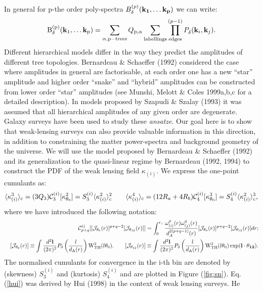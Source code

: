 \documentclass[usenatbib]{mn2e}
\def\be{\begin{equation}}
\def\ee{\end{equation}}
\def\be{\begin{equation}}
\def\ee{\end{equation}}
\newcommand{\beqa}{\begin{eqnarray}}
\newcommand{\eeqa}{\end{eqnarray}}
\def\ikap0{{\cal J}_{\theta_0}(r)}
\def\ikapp{{\cal J}_{\theta_{12}}(r)}
\begin{document}
%
In general for p-the order poly-spectra $B^{(p)}_{\delta}( {\bf k_1}, \dots {\bf k_p} )$ we can write:
\begin{equation}
{\rm B}^{({\rm p})}_{\delta}( {\bf k}_1, \dots {\bf k}_{\rm p} ) = \sum_{\alpha, \rm p-trees}
Q_{{\rm p},\alpha} \sum_{\rm labellings} \prod_{\rm edges}^{(p-1)}
P^{}_{\delta}({\bf k}_i, {\bf k}_j) .
\end{equation}
%
Different hierarchical models differ in the way they predict the
amplitudes of different tree topologies. Bernardeau \&
Schaeffer (1992) considered the case where amplitudes in general are
factorisable, at each order one has a new ``star'' amplitude 
 and higher order ``snake'' and ``hybrid'' amplitudes can
be constructed from lower order ``star'' amplitudes (see Munshi,
Melott \& Coles 1999a,b,c for a detailed description). In models proposed by
Szapudi \& Szalay (1993) it was assumed that all hierarchical amplitudes of any
given order are degenerate. Galaxy surveys
have been used to study these {\em ansatze}. Our goal here is to
show that weak-lensing surveys can also provide valuable information
in this direction, in addition to constraining the matter power-spectra and
background geometry of the universe. We will use the model proposed by 
Bernardeau \& Schaeffer (1992) and its generalization to the 
quasi-linear regime by Bernardeau (1992, 1994) to construct the PDF
of the weak lensing field $\kappa_{(i)}$. We express 
the one-point cumulants as:
%
\be
\langle \kappa_{(i)}^3\rangle_c = (3Q_3){\cal C}^{(i)}_3[\kappa^2_{\theta_0}] 
= S_3^{(i)} \langle \kappa_{(i)}^2 \rangle_c^2 \label {hui} \quad\quad
\langle \kappa_{(i)}^4\rangle_c = (12R_a + 4
R_b){\cal C}^{(i)}_4[\kappa^3_{\theta_0}] = S_4^{(i)} \langle \kappa_{(i)}^2\rangle_c^3,
\ee
%
where we have introduced the following notation:
\beqa
&& {\cal C}^{ij}_{p+q}[[\ikap0]^{p+q-2} [\ikapp] ] =
\int_0^{r_s} { \omega_{(i)}^{p}(r)\omega_{(j)}^q(r) \over
d_A^{2(p+q-1)}(r)}[\ikap0]^{p+q-2}[\ikapp] dr; \\
&& [\ikap0] \equiv  \int
 \frac{d^2\bf l}{(2\pi)^2} P_{\delta} \left( {l \over d_{\rm A}(r)} \right)
{\rm W}_{\rm TH}^2(l\theta_0).\quad\quad
[\ikapp] \equiv  \int
 \frac{d^2\bf l}{(2\pi)^2} P_{\delta} \left( {l \over d_{\rm A}(r)} \right)
{\rm W}_{\rm TH}^2(l\theta_0) \exp ( {\bf l} \cdot {\bf \theta_{12}}).
\eeqa
The normalised cumulants for convergence in the i-th bin are denoted by (skewness) $S_3^{(i)}$ and (kurtosis) $S_4^{(i)}$
and are plotted in Figure (\ref{fig:sn}). 
Eq.({\ref {hui}}) was derived by Hui (1998) in the context of weak lensing surveys. He 
\end{document}
